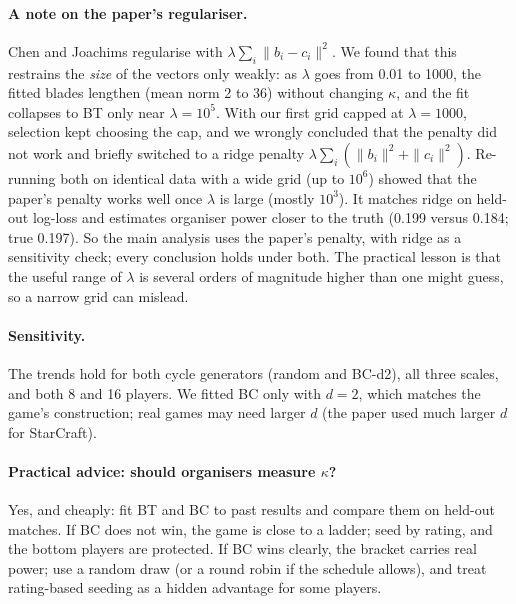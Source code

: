 \documentclass[11pt]{article}
\theoremstyle{remark}
\newcommand{\kap}{\kappa}
\begin{document}
\paragraph{A note on the paper's regulariser.} Chen and Joachims regularise with $\lambda\sum_i\|b_i-c_i\|^2$. We found that
this restrains the \emph{size} of the vectors only weakly: as $\lambda$ goes from 0.01 to 1000, the fitted blades lengthen
(mean norm 2 to 36) without changing $\kap$, and the fit collapses to BT only near $\lambda=10^5$. With our first grid capped at
$\lambda=1000$, selection kept choosing the cap, and we wrongly concluded that the penalty did not work and briefly switched to a
ridge penalty $\lambda\sum_i(\|b_i\|^2+\|c_i\|^2)$. Re-running both on identical data with a wide grid (up to $10^6$) showed that
the paper's penalty works well once $\lambda$ is large (mostly $10^3$). It matches ridge on held-out log-loss and estimates
organiser power closer to the truth (0.199 versus 0.184; true 0.197). So the main analysis uses the paper's penalty, with ridge
as a sensitivity check; every conclusion holds under both. The practical lesson is that the useful range of $\lambda$ is
several orders of magnitude higher than one might guess, so a narrow grid can mislead.

\paragraph{Sensitivity.} The trends hold for both cycle generators (random and BC-d2), all three scales, and both 8 and 16
players. We fitted BC only with $d=2$, which matches the game's construction; real games may need larger $d$ (the paper used
much larger $d$ for StarCraft).

\paragraph{Practical advice: should organisers measure $\kap$?} Yes, and cheaply: fit BT and BC to past results and compare them
on held-out matches. If BC does not win, the game is close to a ladder; seed by rating, and the bottom players are protected. If
BC wins clearly, the bracket carries real power; use a random draw (or a round robin if the schedule allows), and treat rating-based
seeding as a hidden advantage for some players.
\end{document}
